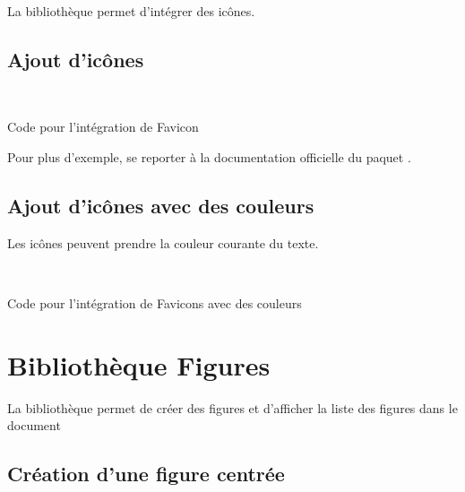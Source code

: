 {La bibliothèque  permet d'intégrer des icônes.

\section{Ajout d'icônes}

\faviconGithub~
\faviconCheck~
\faviconBookmark~
\faviconLeaf~
\faviconFile~
\faviconGear~
\faviconClose~
\faviconWarning~
\faviconInfo~
\faviconSearch~
\faviconLink~
\faviconClock~
\faviconChat~
\faviconSymbolicLink


\begin{Latex}{Code pour l'intégration de Favicon}
\faviconGithub~
\faviconCheck~
\faviconBookmark~
\faviconLeaf~
\faviconFile~
\faviconGear~
\faviconClose~
\faviconWarning~
\faviconInfo~
\faviconSearch~
\faviconLink~
\faviconClock~
\faviconChat~
\faviconSymbolicLink
\end{Latex}

Pour plus d'exemple, se reporter à la documentation officielle du paquet .

\section{Ajout d'icônes avec des couleurs}

Les icônes peuvent prendre la couleur courante du texte.

~~ \newpage

\begin{Latex}{Code pour l'intégration de Favicons avec des couleurs}
~~ 
\end{Latex}

\chapter{Bibliothèque Figures}

La bibliothèque  permet de créer des figures et d'afficher la liste des figures dans le document

\section{Création d'une figure centrée}


}
